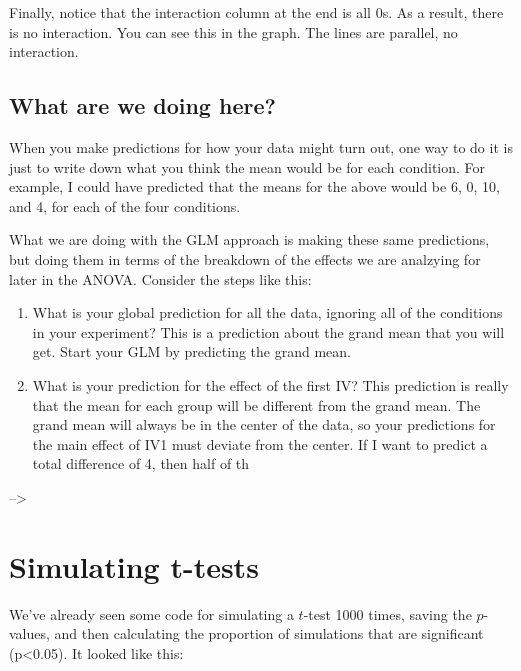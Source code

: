 \documentclass[
]{book}
\begin{document}
Finally, notice that the interaction column at the end is all 0s. As a result, there is no interaction. You can see this in the graph. The lines are parallel, no interaction.

\hypertarget{what-are-we-doing-here}{%
\subsection{What are we doing here?}\label{what-are-we-doing-here}}

When you make predictions for how your data might turn out, one way to do it is just to write down what you think the mean would be for each condition. For example, I could have predicted that the means for the above would be 6, 0, 10, and 4, for each of the four conditions.

What we are doing with the GLM approach is making these same predictions, but doing them in terms of the breakdown of the effects we are analzying for later in the ANOVA. Consider the steps like this:

\begin{enumerate}
\def\labelenumi{\arabic{enumi}.}
\item
  What is your global prediction for all the data, ignoring all of the conditions in your experiment? This is a prediction about the grand mean that you will get. Start your GLM by predicting the grand mean.
\item
  What is your prediction for the effect of the first IV? This prediction is really that the mean for each group will be different from the grand mean. The grand mean will always be in the center of the data, so your predictions for the main effect of IV1 must deviate from the center. If I want to predict a total difference of 4, then half of th
\end{enumerate}

--\textgreater{}

\hypertarget{simulating-t-tests}{%
\section{Simulating t-tests}\label{simulating-t-tests}}

We've already seen some code for simulating a \(t\)-test 1000 times, saving the \(p\)-values, and then calculating the proportion of simulations that are significant (p\textless0.05). It looked like this:
\end{document}
